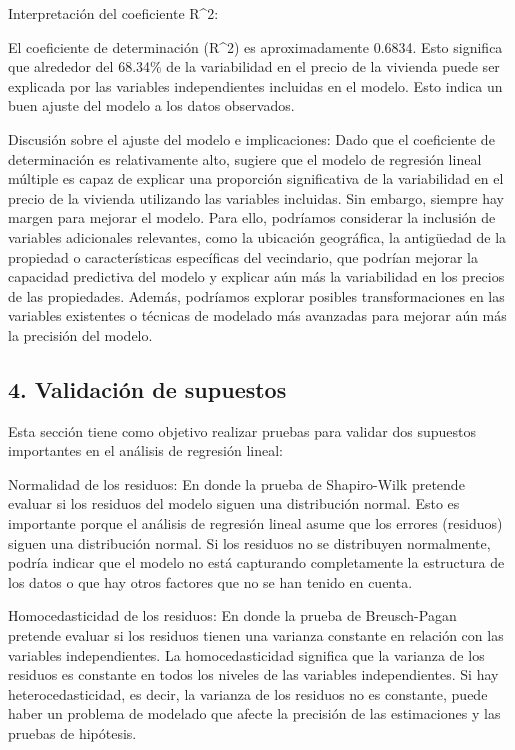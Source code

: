 \documentclass[
]{article}
\begin{document}
Interpretación del coeficiente R\^{}2:

El coeficiente de determinación (R\^{}2) es aproximadamente 0.6834. Esto
significa que alrededor del 68.34\% de la variabilidad en el precio de
la vivienda puede ser explicada por las variables independientes
incluidas en el modelo. Esto indica un buen ajuste del modelo a los
datos observados.

Discusión sobre el ajuste del modelo e implicaciones: Dado que el
coeficiente de determinación es relativamente alto, sugiere que el
modelo de regresión lineal múltiple es capaz de explicar una proporción
significativa de la variabilidad en el precio de la vivienda utilizando
las variables incluidas. Sin embargo, siempre hay margen para mejorar el
modelo. Para ello, podríamos considerar la inclusión de variables
adicionales relevantes, como la ubicación geográfica, la antigüedad de
la propiedad o características específicas del vecindario, que podrían
mejorar la capacidad predictiva del modelo y explicar aún más la
variabilidad en los precios de las propiedades. Además, podríamos
explorar posibles transformaciones en las variables existentes o
técnicas de modelado más avanzadas para mejorar aún más la precisión del
modelo.

\subsection{4. Validación de
supuestos}\label{validaciuxf3n-de-supuestos}

Esta sección tiene como objetivo realizar pruebas para validar dos
supuestos importantes en el análisis de regresión lineal:

Normalidad de los residuos: En donde la prueba de Shapiro-Wilk pretende
evaluar si los residuos del modelo siguen una distribución normal. Esto
es importante porque el análisis de regresión lineal asume que los
errores (residuos) siguen una distribución normal. Si los residuos no se
distribuyen normalmente, podría indicar que el modelo no está capturando
completamente la estructura de los datos o que hay otros factores que no
se han tenido en cuenta.

Homocedasticidad de los residuos: En donde la prueba de Breusch-Pagan
pretende evaluar si los residuos tienen una varianza constante en
relación con las variables independientes. La homocedasticidad significa
que la varianza de los residuos es constante en todos los niveles de las
variables independientes. Si hay heterocedasticidad, es decir, la
varianza de los residuos no es constante, puede haber un problema de
modelado que afecte la precisión de las estimaciones y las pruebas de
hipótesis.
\end{document}
